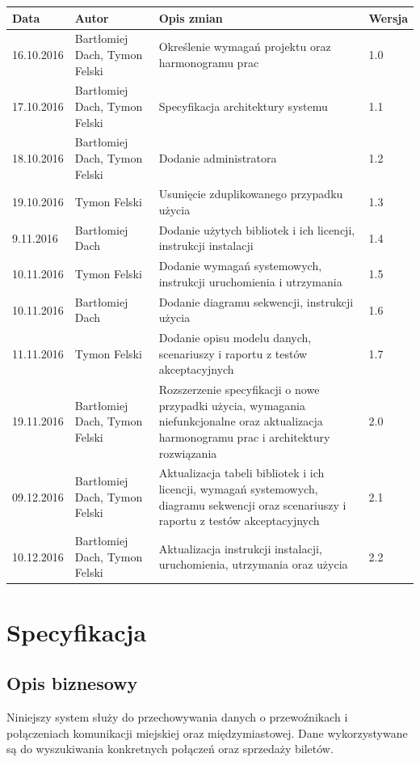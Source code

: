 \documentclass[10pt,a4paper]{article}
\begin{document}
\begin{table}[H]
\def\arraystretch{1.5}
\begin{tabularx}{\textwidth}{|l|l|X|l|}
	\hline
	\textbf{Data} & \textbf{Autor} & \textbf{Opis zmian} & \textbf{Wersja} \\
	\hline
	16.10.2016 & Bartłomiej Dach, Tymon Felski & Określenie wymagań projektu oraz harmonogramu prac & 1.0 \\
	\hline
	17.10.2016 & Bartłomiej Dach, Tymon Felski & Specyfikacja architektury systemu & 1.1 \\
	\hline
	18.10.2016 & Bartłomiej Dach, Tymon Felski & Dodanie administratora & 1.2 \\
	\hline
	19.10.2016 & Tymon Felski & Usunięcie zduplikowanego przypadku użycia & 1.3 \\
	\hline
	9.11.2016 & Bartłomiej Dach & Dodanie użytych bibliotek i ich licencji, instrukcji instalacji & 1.4 \\
	\hline
	10.11.2016 & Tymon Felski & Dodanie wymagań systemowych, instrukcji uruchomienia i utrzymania & 1.5 \\
	\hline
	10.11.2016 & Bartłomiej Dach & Dodanie diagramu sekwencji, instrukcji użycia & 1.6 \\
	\hline
	11.11.2016 & Tymon Felski & Dodanie opisu modelu danych, scenariuszy i raportu z testów akceptacyjnych & 1.7 \\
	\hline
	19.11.2016 & Bartłomiej Dach, Tymon Felski & Rozszerzenie specyfikacji o nowe przypadki użycia, wymagania niefunkcjonalne oraz aktualizacja harmonogramu prac i architektury rozwiązania & 2.0 \\
	\hline
	09.12.2016 & Bartłomiej Dach, Tymon Felski & Aktualizacja tabeli bibliotek i ich licencji, wymagań systemowych, diagramu sekwencji oraz scenariuszy i raportu z testów akceptacyjnych & 2.1 \\
	\hline
	10.12.2016 & Bartłomiej Dach, Tymon Felski & Aktualizacja instrukcji instalacji, uruchomienia, utrzymania oraz użycia & 2.2 \\
	\hline
\end{tabularx}
\end{table}

\newpage
\tableofcontents
\newpage

\section{Specyfikacja}

\subsection{Opis biznesowy}
Niniejszy system służy do przechowywania danych o przewoźnikach i połączeniach komunikacji miejskiej oraz międzymiastowej. Dane wykorzystywane są do wyszukiwania konkretnych połączeń oraz sprzedaży biletów.
\end{document}

